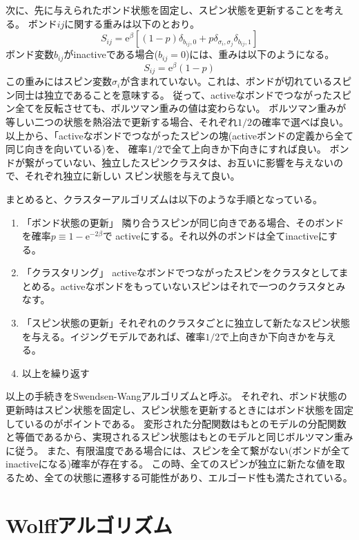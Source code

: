 \documentclass{jarticle}
\begin{document}
次に、先に与えられたボンド状態を固定し、スピン状態を更新することを考える。
ボンド$ij$に関する重みは以下のとおり。
\begin{equation}
  S_{ij} = \mathrm{e}^{\beta} \left[(1-p) \delta_{b_{ij},0} +  p \delta_{\sigma_i, \sigma_j} \delta_{b_{ij},1} \right]
\end{equation}
ボンド変数$b_{ij}$がinactiveである場合($b_{ij}=0$)には、重みは以下のようになる。
\begin{equation}
  S_{ij} = \mathrm{e}^{\beta} (1-p)
\end{equation}
この重みにはスピン変数$\sigma_i$が含まれていない。これは、ボンドが切れているスピン同士は独立であることを意味する。
従って、activeなボンドでつながったスピン全てを反転させても、ボルツマン重みの値は変わらない。
ボルツマン重みが等しい二つの状態を熱浴法で更新する場合、それぞれ$1/2$の確率で選べば良い。
以上から、「activeなボンドでつながったスピンの塊(activeボンドの定義から全て同じ向きを向いている)を、
確率$1/2$で全て上向きか下向きにすれば良い。
ボンドが繋がっていない、独立したスピンクラスタは、お互いに影響を与えないので、それぞれ独立に新しい
スピン状態を与えて良い。

まとめると、クラスターアルゴリズムは以下のような手順となっている。
\begin{enumerate}
  \item 「ボンド状態の更新」 隣り合うスピンが同じ向きである場合、そのボンドを確率$p \equiv 1 - \mathrm{e}^{-2 \beta}$で
        activeにする。それ以外のボンドは全てinactiveにする。
  \item 「クラスタリング」 activeなボンドでつながったスピンをクラスタとしてまとめる。activeなボンドをもっていないスピンはそれで一つのクラスタとみなす。
  \item 「スピン状態の更新」それぞれのクラスタごとに独立して新たなスピン状態を与える。イジングモデルであれば、確率$1/2$で上向きか下向きかを与える。
  \item 以上を繰り返す
\end{enumerate}
以上の手続きをSwendsen-Wangアルゴリズムと呼ぶ\cite{SW}。
それぞれ、ボンド状態の更新時はスピン状態を固定し、スピン状態を更新するときにはボンド状態を固定しているのがポイントである。
変形された分配関数はもとのモデルの分配関数と等価であるから、実現されるスピン状態はもとのモデルと同じボルツマン重みに従う。
また、有限温度である場合には、スピンを全て繋がない(ボンドが全てinactiveになる)確率が存在する。
この時、全てのスピンが独立に新たな値を取るため、全ての状態に遷移する可能性があり、エルゴード性も満たされている。

\section{Wolffアルゴリズム}
\end{document}
